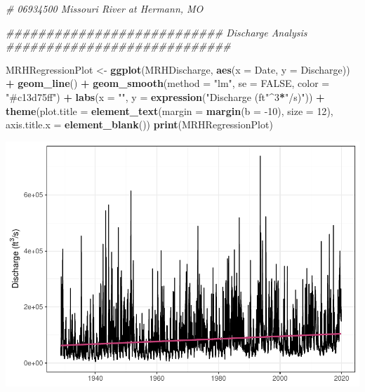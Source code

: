 \documentclass[12pt,]{article}
\newenvironment{Shaded}{\begin{snugshade}}{\end{snugshade}}
\newcommand{\CommentTok}[1]{\textcolor[rgb]{0.56,0.35,0.01}{\textit{#1}}}
\newcommand{\DataTypeTok}[1]{\textcolor[rgb]{0.13,0.29,0.53}{#1}}
\newcommand{\DecValTok}[1]{\textcolor[rgb]{0.00,0.00,0.81}{#1}}
\newcommand{\KeywordTok}[1]{\textcolor[rgb]{0.13,0.29,0.53}{\textbf{#1}}}
\newcommand{\NormalTok}[1]{#1}
\newcommand{\OperatorTok}[1]{\textcolor[rgb]{0.81,0.36,0.00}{\textbf{#1}}}
\newcommand{\OtherTok}[1]{\textcolor[rgb]{0.56,0.35,0.01}{#1}}
\newcommand{\StringTok}[1]{\textcolor[rgb]{0.31,0.60,0.02}{#1}}
\begin{document}
\begin{Shaded}
\begin{Highlighting}[]
\CommentTok{# 06934500 Missouri River at Hermann, MO }

\CommentTok{########################### Discharge Analysis ############################}

\NormalTok{MRHRegressionPlot <-}\StringTok{ }
\StringTok{  }\KeywordTok{ggplot}\NormalTok{(MRHDischarge, }\KeywordTok{aes}\NormalTok{(}\DataTypeTok{x =}\NormalTok{ Date, }\DataTypeTok{y =}\NormalTok{ Discharge)) }\OperatorTok{+}
\StringTok{  }\KeywordTok{geom_line}\NormalTok{() }\OperatorTok{+}
\StringTok{  }\KeywordTok{geom_smooth}\NormalTok{(}\DataTypeTok{method =} \StringTok{"lm"}\NormalTok{, }\DataTypeTok{se =} \OtherTok{FALSE}\NormalTok{, }\DataTypeTok{color =} \StringTok{"#c13d75ff"}\NormalTok{) }\OperatorTok{+}
\StringTok{  }\KeywordTok{labs}\NormalTok{(}\DataTypeTok{x =} \StringTok{""}\NormalTok{, }\DataTypeTok{y =} \KeywordTok{expression}\NormalTok{(}\StringTok{"Discharge (ft"}\OperatorTok{^}\DecValTok{3}\OperatorTok{*}\StringTok{"/s)"}\NormalTok{)) }\OperatorTok{+}\StringTok{ }
\StringTok{  }\KeywordTok{theme}\NormalTok{(}\DataTypeTok{plot.title =} \KeywordTok{element_text}\NormalTok{(}\DataTypeTok{margin =} \KeywordTok{margin}\NormalTok{(}\DataTypeTok{b =} \DecValTok{-10}\NormalTok{), }\DataTypeTok{size =} \DecValTok{12}\NormalTok{), }
        \DataTypeTok{axis.title.x =} \KeywordTok{element_blank}\NormalTok{())}
\KeywordTok{print}\NormalTok{(MRHRegressionPlot)}
\end{Highlighting}
\end{Shaded}

\includegraphics{Project_Template_files/figure-latex/unnamed-chunk-6-10.pdf}
\end{document}
